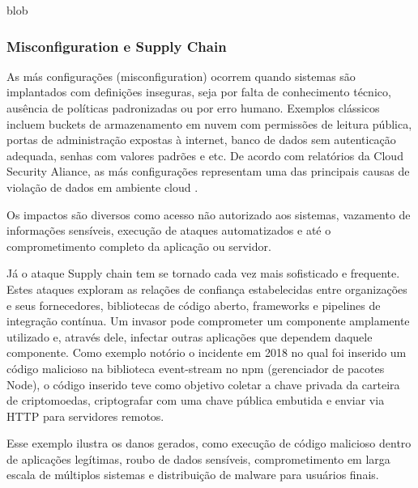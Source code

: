 blob

\subsubsection{Misconfiguration e Supply Chain}

As más configurações (misconfiguration) ocorrem quando sistemas são implantados com definições inseguras, seja por falta de conhecimento técnico, ausência de políticas padronizadas ou por erro humano. Exemplos clássicos incluem buckets de armazenamento em nuvem com permissões de leitura pública, portas de administração expostas à internet, banco de dados sem autenticação adequada, senhas com valores padrões e etc. De acordo com relatórios da Cloud Security Aliance, as más configurações representam uma das principais causas de violação de dados em ambiente cloud \cite{cloudsecurityalliance:2024}.


Os impactos são diversos como acesso não autorizado aos sistemas, vazamento de informações sensíveis, execução de ataques automatizados e até o comprometimento completo da aplicação ou servidor.

Já o ataque Supply chain tem se tornado cada vez mais sofisticado e frequente. Estes ataques exploram as relações de confiança estabelecidas entre organizações e seus fornecedores, bibliotecas de código aberto, frameworks e pipelines de integração contínua. Um invasor pode comprometer um componente amplamente utilizado e, através dele, infectar outras aplicações que dependem daquele componente. Como exemplo notório o incidente em 2018 no qual foi inserido um código malicioso na biblioteca event-stream no npm (gerenciador de pacotes Node), o código inserido teve como objetivo coletar a chave privada da carteira de criptomoedas, criptografar com uma chave pública embutida e enviar via HTTP para servidores remotos.

Esse exemplo ilustra os danos gerados, como execução de código malicioso dentro de aplicações legítimas, roubo de dados sensíveis, comprometimento em larga escala de múltiplos sistemas e distribuição de malware para usuários finais.
% 
